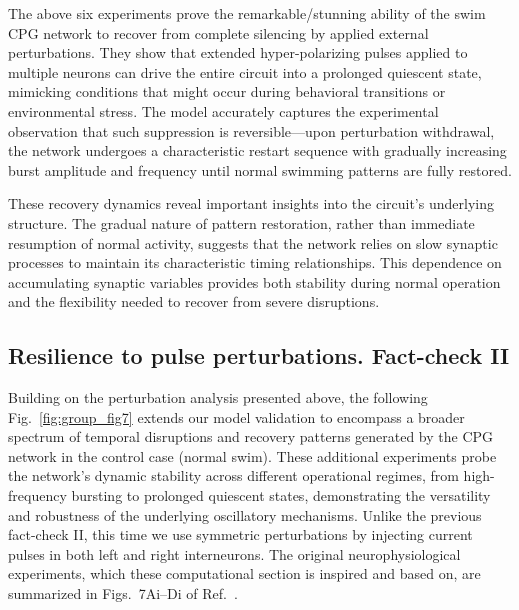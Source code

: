 \documentclass[nofootinbib,aip,amsmath,amssymb,reprint,twocolumn,10pt]{revtex4-2}
\begin{document}
The above six experiments prove  the remarkable/stunning ability of the swim CPG network to recover from complete silencing by applied external perturbations. They show that extended hyper-polarizing pulses applied to multiple neurons can drive the entire circuit into a prolonged quiescent state, mimicking conditions that might occur during behavioral transitions or environmental stress. The model accurately captures the experimental observation that such suppression is reversible—upon perturbation withdrawal, the network undergoes a characteristic restart sequence with gradually increasing burst amplitude and frequency until normal swimming patterns are fully restored.

These recovery dynamics reveal important insights into the circuit's underlying structure. The gradual nature of pattern restoration, rather than immediate resumption of normal activity, suggests that the network relies on slow synaptic processes to maintain its characteristic timing relationships. This dependence on accumulating synaptic variables provides both stability during normal operation and the flexibility needed to recover from severe disruptions.


\subsection{Resilience to pulse perturbations. Fact-check II}

Building on the perturbation analysis presented above, the following Fig.~\ref{fig:group_fig7} extends our model validation to encompass a broader spectrum of temporal disruptions and recovery patterns generated by the CPG network in the control case (normal swim). These additional experiments probe the network's dynamic stability across different operational regimes, from high-frequency bursting to prolonged quiescent states, demonstrating the versatility and robustness of the underlying oscillatory mechanisms. Unlike the previous fact-check II, this time we use symmetric perturbations by injecting current pulses in both left and right interneurons. The original neurophysiological experiments, which these computational section is inspired and based on, are summarized in Figs.~7Ai–Di of Ref.~\cite{SakuraiKatz2016}.
\end{document}
